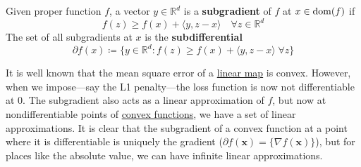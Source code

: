 	\begin{definition}
	  \label{def:subgradients-subdifferentials}
		Given proper function $f$, a vector $y \in \mathbb{R}^d$ is a \textbf{subgradient} of $f$ at $x \in \operatorname{dom}(f)$ if 
		\begin{equation}
			f(z) \geq f(x) + \langle y, z - x \rangle \quad \forall z \in \mathbb{R}^d
		\end{equation}
		The set of all subgradients at $x$ is the \textbf{subdifferential} 
		\begin{equation}
			\partial f(x) \coloneqq \{ y \in \mathbb{R}^d \colon f(z) \geq f(x) + \langle y, z - x \rangle \; \forall z \}
		\end{equation}
	\end{definition}

  It is well known that the mean square error of a \hyperref[lin-def:linear_map]{linear map} is convex. However, when we impose---say the L1 penalty---the loss function is now not differentiable at $0$. The subgradient also acts as a linear approximation of $f$, but now at nondifferentiable points of \hyperref[mt-def:convex-function]{convex functions}, we have a set of linear approximations. It is clear that the subgradient of a convex function at a point where it is differentiable is uniquely the gradient ($\partial f(\mathbf{x}) = \{ \nabla f(\mathbf{x}) \}$), but for places like the absolute value, we can have infinite linear approximations. 

